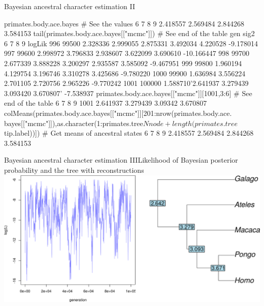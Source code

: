 \documentclass[compress, ucs, xelatex, 11pt, xcolor=svgnames,
	hyperref={
		bookmarks=true,
		unicode=true,
		colorlinks=true,
		pdftitle={Molecular data in R},
		plainpages=false,
		pdfauthor={Vojtech Zeisek},
		pdfsubject={Course about phylogeny and evolution in R},
		pdfcreator={XeLaTeX},
		pdfkeywords={R, evolution, phylogeny, molecular data},
		linkcolor=Tomato,
		anchorcolor=SaddleBrown,
		citecolor=Goldenrod,
		filecolor=DarkMagenta,
		menucolor=Sienna,
		urlcolor=DarkTurquoise,
		pdftex},
	url={hyphens, lowtilde} %
	]{beamer}
\begin{document}
\begin{frame}[fragile]{Bayesian ancestral character estimation II}
	\begin{spluscode}
    primates.body.ace.bayes # See the values
           6        7        8        9
    2.418557 2.569484 2.844268 3.584153
    tail(primates.body.ace.bayes[["mcmc"]]) # See end of the table
            gen     sig2        6        7        8        9     logLik
    996   99500 2.328336 2.999055 2.875331 3.492034 4.220528  -9.178014
    997   99600 2.998972 3.796833 2.938607 3.622099 3.690610 -10.166447
    998   99700 2.677339 3.888228 3.200297 2.935587 3.585092  -9.467951
    999   99800 1.960194 4.129754 3.196746 3.310278 3.425686  -9.780220
    1000  99900 1.636984 3.556224 2.701105 2.720756 2.965226  -9.770242
    1001 100000 1.588710'2.641937 3.279439 3.093420 3.670807' -7.538937
    primates.body.ace.bayes[["mcmc"]][1001,3:6] # See end of the table
                6        7       8        9
    1001 2.641937 3.279439 3.09342 3.670807
    colMeans(primates.body.ace.bayes[["mcmc"]][201:nrow(primates.body.ace.
      bayes[["mcmc"]]),as.character(1:primates.tree$Nnode+length
      (primates.tree$tip.label))]) # Get means of ancestral states
           6        7        8        9
    2.418557 2.569484 2.844268 3.584153
	\end{spluscode}
\end{frame}

\begin{frame}{Bayesian ancestral character estimation III}{Likelihood of Bayesian posterior probability and the tree with reconstructions}
	\includegraphics[width=\textwidth]{ancbayes.png}
\end{frame}
\end{document}
